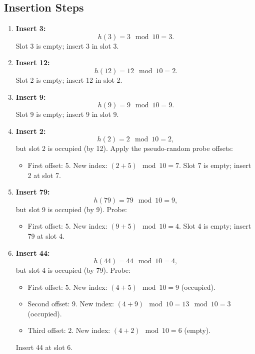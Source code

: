 \documentclass{article}
\begin{document}
\subsection*{Insertion Steps}

\begin{enumerate}[label=\textbf{Step \arabic*:}, leftmargin=1.8cm]
    \item \textbf{Insert 3:} 
    \[
    h(3)=3 \mod 10 = 3.
    \]
    Slot 3 is empty; insert 3 in slot 3.
    
    \item \textbf{Insert 12:} 
    \[
    h(12)=12 \mod 10 = 2.
    \]
    Slot 2 is empty; insert 12 in slot 2.
    
    \item \textbf{Insert 9:} 
    \[
    h(9)=9 \mod 10 = 9.
    \]
    Slot 9 is empty; insert 9 in slot 9.
    
    \item \textbf{Insert 2:} 
    \[
    h(2)=2 \mod 10 = 2,
    \]
    but slot 2 is occupied (by 12). Apply the pseudo-random probe offsets:
    \begin{itemize}
        \item First offset: \(5\). New index: \((2+5) \mod 10 = 7\). Slot 7 is empty; insert 2 at slot 7.
    \end{itemize}
    
    \item \textbf{Insert 79:} 
    \[
    h(79)=79 \mod 10 = 9,
    \]
    but slot 9 is occupied (by 9). Probe:
    \begin{itemize}
        \item First offset: \(5\). New index: \((9+5) \mod 10 = 4\). Slot 4 is empty; insert 79 at slot 4.
    \end{itemize}
    
    \item \textbf{Insert 44:} 
    \[
    h(44)=44 \mod 10 = 4,
    \]
    but slot 4 is occupied (by 79). Probe:
    \begin{itemize}
        \item First offset: \(5\). New index: \((4+5) \mod 10 = 9\) (occupied).
        \item Second offset: \(9\). New index: \((4+9) \mod 10 = 13 \mod 10 = 3\) (occupied).
        \item Third offset: \(2\). New index: \((4+2) \mod 10 = 6\) (empty).
    \end{itemize}
    Insert 44 at slot 6.
\end{enumerate}
\end{document}
